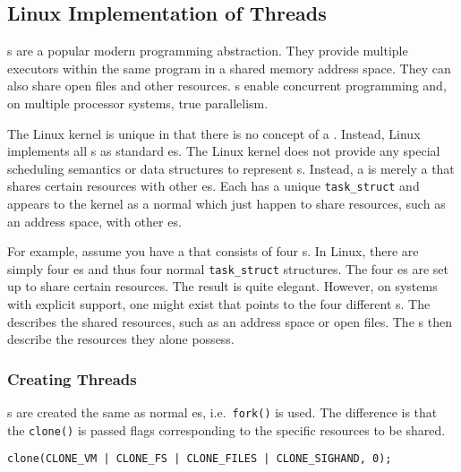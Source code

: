 \subsection{Linux Implementation of Threads}\label{subsec:Linux_Implementation_Threads}
s are a popular modern programming abstraction.
They provide multiple executors within the same program in a shared memory address space.
They can also share open files and other resources.
s enable concurrent programming and, on multiple processor systems, true parallelism.

The Linux kernel is unique in that there is no concept of a .
Instead, Linux implements all s as standard es.
The Linux kernel does not provide any special scheduling semantics or data structures to represent s.
Instead, a  is merely a  that shares certain resources with other es.
Each  has a unique \texttt{task_struct} and appears to the kernel as a normal  which just happen to share resources, such as an address space, with other es.

For example, assume you have a  that consists of four s.
In Linux, there are simply four es and thus four normal \texttt{task_struct} structures.
The four es are set up to share certain resources.
The result is quite elegant.
However, on systems with explicit  support, one  might exist that points to the four different s.
The  describes the shared resources, such as an address space or open files.
The s then describe the resources they alone possess.

\subsubsection{Creating Threads}\label{subsubsec:Creating_Threads}
s are created the same as normal es, i.e.\ \texttt{fork()} is used.
The difference is that the \texttt{clone()}  is passed flags corresponding to the specific resources to be shared.
\begin{verbatim}
clone(CLONE_VM | CLONE_FS | CLONE_FILES | CLONE_SIGHAND, 0);
\end{verbatim}

